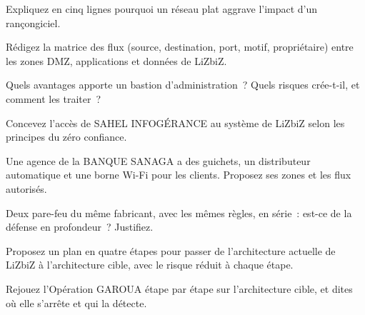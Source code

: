 \begin{boxexo}[title={\ding{45}\quad Exercice~14.3. Réseau plat \niveaubase}]
Expliquez en cinq lignes pourquoi un réseau plat aggrave l'impact d'un
rançongiciel.
\end{boxexo}

\begin{boxexo}[title={\ding{45}\quad Exercice~14.4. La matrice des flux \niveaumoyen}]
Rédigez la matrice des flux (source, destination, port, motif,
propriétaire) entre les zones DMZ, applications et données de LiZbiZ.
\end{boxexo}

\begin{boxexo}[title={\ding{45}\quad Exercice~14.5. Le bastion \niveaumoyen}]
Quels avantages apporte un bastion d'administration~? Quels risques
crée-t-il, et comment les traiter~?
\end{boxexo}

\begin{boxexo}[title={\ding{45}\quad Exercice~14.6. Le prestataire \niveaumoyen}]
Concevez l'accès de SAHEL INFOGÉRANCE au système de LiZbiZ selon les
principes du zéro confiance.
\end{boxexo}

\begin{boxexo}[title={\ding{45}\quad Exercice~14.7. L'agence \niveaumoyen}]
Une agence de la BANQUE SANAGA a des guichets, un distributeur
automatique et une borne Wi-Fi pour les clients. Proposez ses zones et les
flux autorisés.
\end{boxexo}

\begin{boxexo}[title={\ding{45}\quad Exercice~14.8. Indépendance des mesures \niveaumoyen}]
Deux pare-feu du même fabricant, avec les mêmes règles, en série~:
est-ce de la défense en profondeur~? Justifiez.
\end{boxexo}

\begin{boxexo}[title={\ding{45}\quad Exercice~14.9. La migration \niveauexpert}]
Proposez un plan en quatre étapes pour passer de l'architecture actuelle
de LiZbiZ à l'architecture cible, avec le risque réduit à chaque étape.
\end{boxexo}

\begin{boxexo}[title={\ding{45}\quad Exercice~14.10. Rejouer l'attaque \niveauexpert}]
Rejouez l'Opération GAROUA étape par étape sur l'architecture cible, et
dites où elle s'arrête et qui la détecte.
\end{boxexo}


